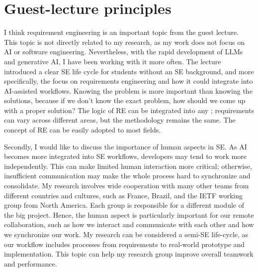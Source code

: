 \documentclass[11pt]{article}
\begin{document}
\section{Guest-lecture principles}
I think requirement engineering is an important topic from the guest lecture. This topic is not directly related to my research, as my work does not focus on AI or software engineering. Nevertheless, with the rapid development of LLMs and generative AI, I have been working with it more often. The lecture introduced a clear SE life cycle for students without an SE background, and more specifically, the focus on requirements engineering and how it could integrate into AI-assisted workflows. Knowing the problem is more important than knowing the solutions, because if we don't know the exact problem, how should we come up with a proper solution? The logic of RE can be integrated into any ; requirements can vary across different areas, but the methodology remains the same. The concept of RE can be easily adopted to most fields. 

Secondly, I would like to discuss the importance of human aspects in SE. As AI becomes more integrated into SE workflows, developers may tend to work more independently. This can make limited human interaction more critical; otherwise, insufficient communication may make the whole process hard to synchronize and consolidate. My research involves wide cooperation with many other teams from different countries and cultures, such as France, Brazil, and the IETF working group from North America. Each group is responsible for a different module of the big project. Hence, the human aspect is particularly important for our remote collaboration, such as how we interact and communicate with each other and how we synchronize our work. My research can be considered a semi-SE life-cycle, as our workflow includes processes from requirements to real-world prototype and implementation. This topic can help my research group improve overall teamwork and performance.
\end{document}
